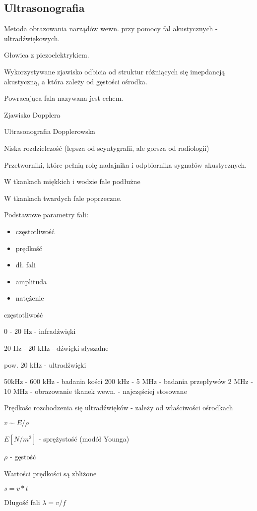 \documentclass{article}
\begin{document}
\subsection{Ultrasonografia}

Metoda obrazowania narządów wewn. przy pomocy fal akustycznych - ultradźwiękowych.

Głowica z piezoelektrykiem.

Wykorzystywane zjawisko odbicia od struktur różniących się imepdancją akustyczną, a która zależy od gęstości ośrodka.

Powracająca fala nazywana jest echem.

Zjawisko Dopplera

Ultrasonografia Dopplerowska

Niska rozdzielczość (lepsza od scyntygrafii, ale gorsza od radiologii)

Przetworniki, które pełnią rolę nadajnika i odpbiornika sygnałów akustycznych.

W tkankach miękkich i wodzie fale podłużne

W tkankach twardych fale poprzeczne.

Podstawowe parametry fali:
\begin{itemize}
    \item częstotliwość
    \item prędkość
    \item dł. fali
    \item amplituda
    \item natężenie
\end{itemize}

częstotliwość

0 - 20 Hz - infradźwięki

20 Hz - 20 kHz - dźwięki słyszalne

pow. 20 kHz - ultradźwięki

50kHz - 600 kHz - badania kości
200 kHz - 5 MHz - badania przepływów
2 MHz - 10 MHz - obrazowanie tkanek wewn. - najczęściej stosowane

Prędkośc rozchodzenia się ultradźwięków - zależy od właściwości ośrodkach

$v \sim E / \rho $

$E [N/m^2]$ - sprężystość (modół Younga)

$\rho$ - gęstość

Wartości prędkości są zbliżone

$s = v * t$

Długość fali $\lambda = v / f$
\end{document}
